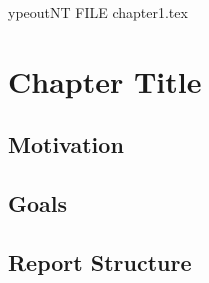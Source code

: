
	ypeout{NT FILE chapter1.tex}%

\chapter{Chapter Title}
\label{cha:chapter1}


\epigraphfontsize{\small\itshape}
\setlength\epigraphwidth{12.5cm}
\setlength\epigraphrule{0pt}


\section{Motivation}
\label{sec:motivation}

\section{Goals}
\label{sec:goals}

\section{Report Structure}
\label{sec:report_structure}

%
%
%



